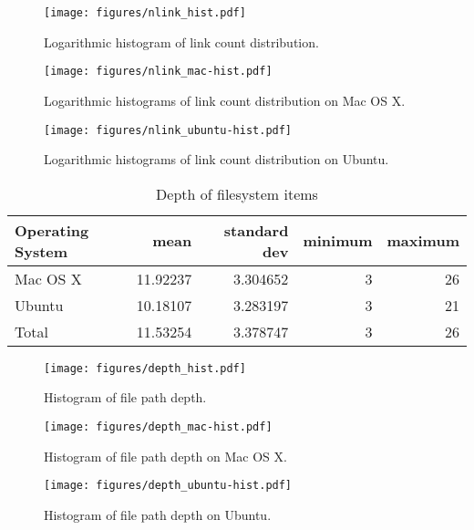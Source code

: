 \documentclass[12pt,letterpaper]{article}
\begin{document}
		\begin{figure}[H]
			\centerline{\texttt{[image: figures/nlink\_hist.pdf]}}
			\caption{Logarithmic histogram of link count distribution.}
			\label{fig:nlink_hist}
		\end{figure}

		\begin{figure}[H]
			\centerline{\texttt{[image: figures/nlink\_mac-hist.pdf]}}
			\caption{Logarithmic histograms of link count distribution on Mac OS X.}
			\label{fig:nlink_mac-hist}
		\end{figure}

		\begin{figure}[H]
			\centerline{\texttt{[image: figures/nlink\_ubuntu-hist.pdf]}}
			\caption{Logarithmic histograms of link count distribution on Ubuntu.}
			\label{fig:nlink_ubuntu-hist}
		\end{figure}


		\begin{table}[h]
		\caption{Depth of filesystem items}
		\label{table:depth}
			\begin{tabular}{l r r r r}
			Operating System & mean  & standard dev & minimum & maximum \\
			\hline
			Mac OS X & 11.92237 & 3.304652 & 3  & 26 \\
			Ubuntu &  10.18107 & 3.283197 & 3 & 21 \\
			Total & 11.53254 & 3.378747 & 3 & 26 \\
			\end{tabular}
		\end{table}


		\begin{figure}[H]
			\centerline{\texttt{[image: figures/depth\_hist.pdf]}}
			\caption{Histogram of file path depth.}
			\label{fig:depth}
		\end{figure}

		\begin{figure}[H]
			\centerline{\texttt{[image: figures/depth\_mac-hist.pdf]}}
			\caption{Histogram of file path depth on Mac OS X.}
			\label{fig:mac-depth}
		\end{figure}

				\begin{figure}[H]
			\centerline{\texttt{[image: figures/depth\_ubuntu-hist.pdf]}}
			\caption{Histogram of file path depth on Ubuntu.}
			\label{fig:ubuntu-depth}
		\end{figure}
\end{document}
